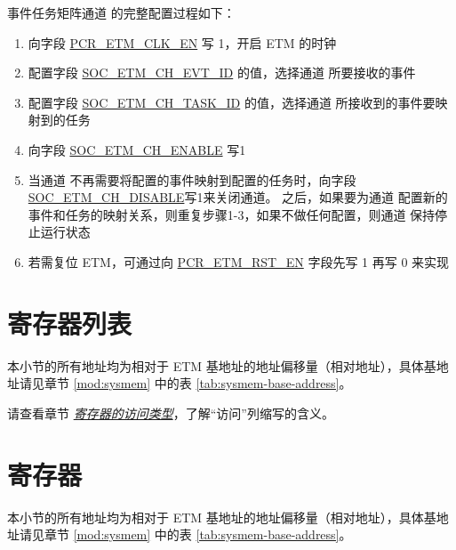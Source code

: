 \documentclass[main\_\_CN.tex]{subfiles}
\begin{document}
事件任务矩阵通道 的完整配置过程如下：
\begin{enumerate}
    \item 向字段 \hyperref[fielddesc:PCRETMCLKEN]{PCR\_ETM\_CLK\_EN} 写 1，开启 ETM 的时钟
    \item 配置字段 \hyperref[fielddesc:SOCETMCH0EVTID]{SOC\_ETM\_CH\_EVT\_ID} 的值，选择通道 所要接收的事件
    \item 配置字段 \hyperref[fielddesc:SOCETMCH0TASKID]{SOC\_ETM\_CH\_TASK\_ID} 的值，选择通道 所接收到的事件要映射到的任务
    \item 向字段 \hyperref[fielddesc:SOCETMCHENABLE0]{SOC\_ETM\_CH\_ENABLE} 写1
    \item 当通道 不再需要将配置的事件映射到配置的任务时，向字段\hyperref[fielddesc:SOCETMCHDISABLE0]{SOC\_ETM\_CH\_DISABLE}写1来关闭通道。 之后，如果要为通道 配置新的事件和任务的映射关系，则重复步骤1-3，如果不做任何配置，则通道 保持停止运行状态
    \item 若需复位 ETM，可通过向 \hyperref[fielddesc:PCRETMRSTEN]{PCR\_ETM\_RST\_EN} 字段先写 1 再写 0 来实现
\end{enumerate}






\clearpage
\hypertarget{evntaskmatrix-reg-summ}{}
\section{寄存器列表}
\label{sec:evntaskmatrix-reg-summ}

本小节的所有地址均为相对于 ETM 基地址的地址偏移量（相对地址），具体基地址请见章节 \ref{mod:sysmem} \textit{} 中的表 \ref{tab:sysmem-base-address}。

请查看章节 \hyperref[glossary-access-types]{\textit{寄存器的访问类型}}，了解“访问”列缩写的含义。






\clearpage
\section{寄存器}

本小节的所有地址均为相对于 ETM 基地址的地址偏移量（相对地址），具体基地址请见章节 \ref{mod:sysmem} \textit{} 中的表 \ref{tab:sysmem-base-address}。


\end{document}
